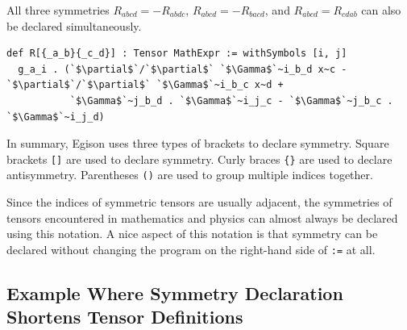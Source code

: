 All three symmetries $R_{abcd} = -R_{abdc}$, $R_{abcd} = -R_{bacd}$, and $R_{abcd} = R_{cdab}$ can also be declared simultaneously.
\begin{lstlisting}[language=egison,numbers=none]
def R[{_a_b}{_c_d}] : Tensor MathExpr := withSymbols [i, j]
  g_a_i . (`$\partial$`/`$\partial$` `$\Gamma$`~i_b_d x~c - `$\partial$`/`$\partial$` `$\Gamma$`~i_b_c x~d +
           `$\Gamma$`~j_b_d . `$\Gamma$`~i_j_c - `$\Gamma$`~j_b_c . `$\Gamma$`~i_j_d)
\end{lstlisting}

In summary, Egison uses three types of brackets to declare symmetry.
Square brackets \lstinline|[]| are used to declare symmetry.
Curly braces \lstinline|{}| are used to declare antisymmetry.
Parentheses \lstinline|()| are used to group multiple indices together.

Since the indices of symmetric tensors are usually adjacent, the symmetries of tensors encountered in mathematics and physics can almost always be declared using this notation.
A nice aspect of this notation is that symmetry can be declared without changing the program on the right-hand side of \lstinline{:=} at all.


\subsection{Example Where Symmetry Declaration Shortens Tensor Definitions}

